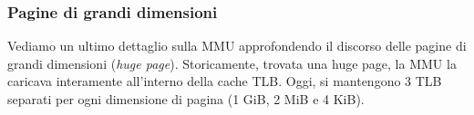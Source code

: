 \documentclass[a4paper,11pt]{article}
\begin{document}
\subsubsection{Pagine di grandi dimensioni}
Vediamo un ultimo dettaglio sulla MMU approfondendo il discorso delle pagine di grandi dimensioni (\textit{huge page}).
Storicamente, trovata una huge page, la MMU la caricava interamente all'interno della cache TLB.
Oggi, si mantengono 3 TLB separati per ogni dimensione di pagina (1 GiB, 2 MiB e 4 KiB).
\end{document}
